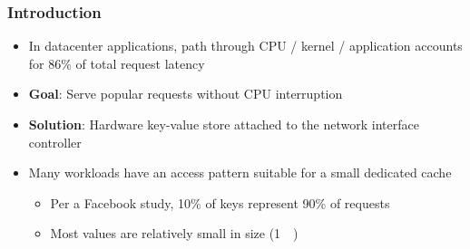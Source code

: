 \frametitle{Introduction}

\begin{itemize}
    \item In datacenter applications, path through CPU / kernel / application
        accounts for 86\% of total request latency
    \item \textbf{Goal}: Serve popular requests without CPU interruption
    \item \textbf{Solution}: Hardware key-value store attached to the network
        interface controller
    \item Many workloads have an access pattern suitable for a small dedicated cache
        \begin{itemize}
            \item Per a Facebook study, 10\% of keys represent 90\% of requests
            \item Most values are relatively small in size (\SI{1}{\kilo\byte})
        \end{itemize}
\end{itemize}
